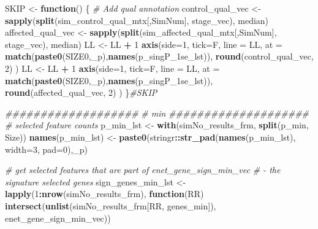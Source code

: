 \documentclass[
]{book}
\newenvironment{Shaded}{\begin{snugshade}}{\end{snugshade}}
\newcommand{\CommentTok}[1]{\textcolor[rgb]{0.56,0.35,0.01}{\textit{#1}}}
\newcommand{\ControlFlowTok}[1]{\textcolor[rgb]{0.13,0.29,0.53}{\textbf{#1}}}
\newcommand{\DataTypeTok}[1]{\textcolor[rgb]{0.13,0.29,0.53}{#1}}
\newcommand{\DecValTok}[1]{\textcolor[rgb]{0.00,0.00,0.81}{#1}}
\newcommand{\KeywordTok}[1]{\textcolor[rgb]{0.13,0.29,0.53}{\textbf{#1}}}
\newcommand{\NormalTok}[1]{#1}
\newcommand{\OperatorTok}[1]{\textcolor[rgb]{0.81,0.36,0.00}{\textbf{#1}}}
\newcommand{\StringTok}[1]{\textcolor[rgb]{0.31,0.60,0.02}{#1}}
\begin{document}
\begin{Shaded}
\begin{Highlighting}[]
\NormalTok{SKIP  <{-}}\StringTok{ }\ControlFlowTok{function}\NormalTok{() \{}
\CommentTok{\# Add qual annotation}
\NormalTok{control\_qual\_vec <{-}}\StringTok{ }\KeywordTok{sapply}\NormalTok{(}\KeywordTok{split}\NormalTok{(sim\_control\_qual\_mtx[,SimNum], stage\_vec), median)}
\NormalTok{affected\_qual\_vec <{-}}\StringTok{ }\KeywordTok{sapply}\NormalTok{(}\KeywordTok{split}\NormalTok{(sim\_affected\_qual\_mtx[,SimNum], stage\_vec), median)}
\NormalTok{LL <{-}}\StringTok{ }\NormalTok{LL }\OperatorTok{+}\StringTok{ }\DecValTok{1}
\KeywordTok{axis}\NormalTok{(}\DataTypeTok{side=}\DecValTok{1}\NormalTok{, }\DataTypeTok{tick=}\NormalTok{F, }\DataTypeTok{line =}\NormalTok{ LL,}
  \DataTypeTok{at =}  \KeywordTok{match}\NormalTok{(}\KeywordTok{paste0}\NormalTok{(SIZE0,}\StringTok{\textquotesingle{}\_p\textquotesingle{}}\NormalTok{),}\KeywordTok{names}\NormalTok{(p\_singP\_1se\_lst)),}
  \KeywordTok{round}\NormalTok{(control\_qual\_vec, }\DecValTok{2}\NormalTok{)}
\NormalTok{ )}
\NormalTok{LL <{-}}\StringTok{ }\NormalTok{LL }\OperatorTok{+}\StringTok{ }\DecValTok{1}
\KeywordTok{axis}\NormalTok{(}\DataTypeTok{side=}\DecValTok{1}\NormalTok{, }\DataTypeTok{tick=}\NormalTok{F, }\DataTypeTok{line =}\NormalTok{ LL,}
  \DataTypeTok{at =}  \KeywordTok{match}\NormalTok{(}\KeywordTok{paste0}\NormalTok{(SIZE0,}\StringTok{\textquotesingle{}\_p\textquotesingle{}}\NormalTok{),}\KeywordTok{names}\NormalTok{(p\_singP\_1se\_lst)),}
  \KeywordTok{round}\NormalTok{(affected\_qual\_vec, }\DecValTok{2}\NormalTok{)}
\NormalTok{ )}
\NormalTok{\}}\CommentTok{\#SKIP}

\CommentTok{\#\#\#\#\#\#\#\#\#\#\#\#\#\#\#\#\#\#\#}
\CommentTok{\# min}
\CommentTok{\#\#\#\#\#\#\#\#\#\#\#\#\#\#\#\#\#\#\#\#}
\CommentTok{\# selected feature counts}
\NormalTok{p\_min\_lst <{-}}\StringTok{ }\KeywordTok{with}\NormalTok{(simNo\_results\_frm,}
 \KeywordTok{split}\NormalTok{(p\_min, Size))}
\KeywordTok{names}\NormalTok{(p\_min\_lst) <{-}}\StringTok{ }\KeywordTok{paste0}\NormalTok{(stringr}\OperatorTok{::}\KeywordTok{str\_pad}\NormalTok{(}\KeywordTok{names}\NormalTok{(p\_min\_lst), }\DataTypeTok{width=}\DecValTok{3}\NormalTok{, }\DataTypeTok{pad=}\StringTok{\textquotesingle{}0\textquotesingle{}}\NormalTok{),}\StringTok{\textquotesingle{}\_p\textquotesingle{}}\NormalTok{)}

\CommentTok{\# get selected features that are part of enet\_gene\_sign\_min\_vec}
\CommentTok{\# {-} the signature selected genes}
\NormalTok{sign\_genes\_min\_lst <{-}}\StringTok{ }\KeywordTok{lapply}\NormalTok{(}\DecValTok{1}\OperatorTok{:}\KeywordTok{nrow}\NormalTok{(simNo\_results\_frm), }\ControlFlowTok{function}\NormalTok{(RR)}
    \KeywordTok{intersect}\NormalTok{(}\KeywordTok{unlist}\NormalTok{(simNo\_results\_frm[RR, }\StringTok{\textquotesingle{}genes\_min\textquotesingle{}}\NormalTok{]), enet\_gene\_sign\_min\_vec))}


\end{Highlighting}
\end{Shaded}
\end{document}
